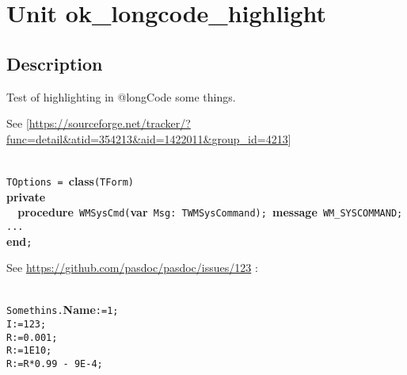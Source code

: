 \documentclass{report}
\begin{document}
\label{toc}\tableofcontents
\newpage
\newlength{\tmplength}
\chapter{Unit ok{\_}longcode{\_}highlight}
\label{ok_longcode_highlight}
\section{Description}
Test of highlighting in @longCode some things.\hfill\vspace*{1ex}



See [\href{https://sourceforge.net/tracker/?func=detail&atid=354213&aid=1422011&group_id=4213}{https://sourceforge.net/tracker/?func=detail{\&}atid=354213{\&}aid=1422011{\&}group{\_}id=4213}]

\texttt{\\\nopagebreak[3]
TOptions~=~}\textbf{class}\texttt{(TForm)\\\nopagebreak[3]
}\textbf{private}\texttt{\\\nopagebreak[3]
~~}\textbf{procedure}\texttt{~WMSysCmd(}\textbf{var}\texttt{~Msg:~TWMSysCommand);~}\textbf{message}\texttt{~WM{\_}SYSCOMMAND;\\\nopagebreak[3]
...\\\nopagebreak[3]
}\textbf{end}\texttt{;\\
}

See \href{https://github.com/pasdoc/pasdoc/issues/123}{https://github.com/pasdoc/pasdoc/issues/123} :

\texttt{\\\nopagebreak[3]
Somethins.}\textbf{Name}\texttt{:=1;\\\nopagebreak[3]
I:=123;\\\nopagebreak[3]
R:=0.001;\\\nopagebreak[3]
R:=1E10;\\\nopagebreak[3]
R:=R*0.99~-~9E-4;\\
}
\end{document}
